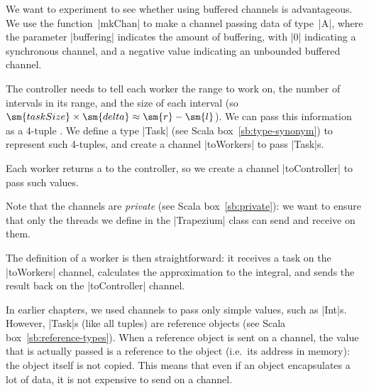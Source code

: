 
We want to experiment to see whether using buffered channels is advantageous.
We use the function~|mkChan| to make a channel passing data of type~|A|, where
the parameter |buffering| indicates the amount of buffering, with |0|
indicating a synchronous channel, and a negative value indicating an unbounded
buffered channel.

The controller needs to tell each worker the range \SCALA{[l,r]} to work on,
the number  of intervals in its range, and the size
 of each interval (so $\sm{taskSize} \times \sm{delta} \approx
\sm{r} - \sm{l}$).  We can pass this information as a 4-tuple .  We define a type |Task| (see Scala
box~\ref{sb:type-synonym}) to represent such 4-tuples, and create a channel
|toWorkers| to pass |Task|s.

Each worker returns a  to the controller, so we create a channel
|toController| to pass such values.

Note that the channels are \emph{private} (see Scala box~\ref{sb:private}): we
want to ensure that only the threads we define in the |Trapezium| class can
send and receive on them.

The definition of a worker is then straightforward: it receives a task on the
|toWorkers| channel, calculates the approximation to the integral, and sends
the result back on the |toController| channel.

In earlier chapters, we used channels to pass only simple values, such as
|Int|s.  However, |Task|s (like all tuples) are reference objects (see Scala
box~\ref{sb:reference-types}).  When a reference object is sent on a channel,
the value that is actually passed is a reference to the object (i.e.~its
address in memory): the object itself is not copied.  This means that even if
an object encapsulates a lot of data, it is not expensive to send on a
channel.


